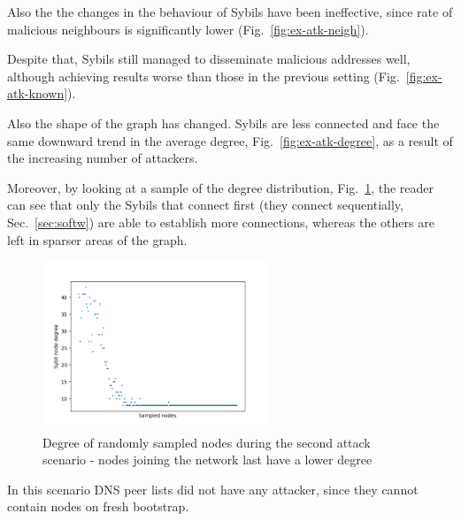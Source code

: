 Also the the changes in the behaviour of Sybils have been ineffective, since rate of malicious neighbours is significantly lower (Fig.~\ref{fig:ex-atk-neigh}).\par

Despite that, Sybils still managed to disseminate malicious addresses well, although achieving results worse than those in the previous setting (Fig.~\ref{fig:ex-atk-known}).\par

Also the shape of the graph has changed. Sybils are less connected and face the same downward trend in the average degree, Fig.~\ref{fig:ex-atk-degree}, as a result of the increasing number of attackers.

Moreover, by looking at a sample of the degree distribution, Fig.~\ref{fig:dd}, the reader can see that only the Sybils that connect first (they connect sequentially, Sec.~\ref{sec:softw}) are able to establish more connections, whereas the others are left in sparser areas of the graph.\par

    \begin{figure}[ht]
        	\centering
			\includegraphics[width=0.6\textwidth]{pict/results/ex-atk-dd.png}
			\caption{Degree of randomly sampled nodes during the second attack scenario - nodes joining the network last have a lower degree}
			\label{fig:dd}
    \end{figure}

In this scenario DNS peer lists did not have any attacker, since they cannot contain nodes on fresh bootstrap.